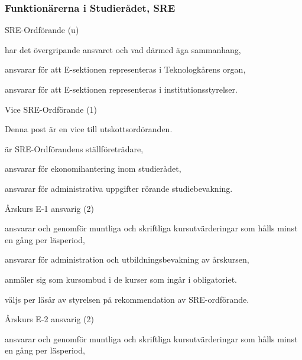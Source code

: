\documentclass[10pt]{article}
\begin{document}
\subsubsection{Funktionärerna i Studierådet, SRE}

\begin{emptylist}
    \item SRE-Ordförande (u)
        \begin{dashlist}
            \item har det övergripande ansvaret och vad därmed äga
                sammanhang,
            \item ansvarar för att E-sektionen representeras i
                Teknologkårens organ,
            \item ansvarar för att E-sektionen representeras i
                institutionsstyrelser.
        \end{dashlist}
    \item Vice SRE-Ordförande (1)
        \begin{dashlist}
            \item Denna post är en vice till utskottsordöranden.
            \item är SRE-Ordförandens ställföreträdare,
            \item ansvarar för ekonomihantering inom studierådet,
            \item ansvarar för administrativa uppgifter rörande
                studiebevakning.
        \end{dashlist}
    \item Årskurs E-1 ansvarig (2)
        \begin{dashlist}
            \item ansvarar och genomför muntliga och skriftliga
                kursutvärderingar som hålls minst en gång per läsperiod,
            \item ansvarar för administration och utbildningsbevakning av
                årskursen,
            \item anmäler sig som kursombud i de kurser som ingår i
                obligatoriet.
            \item väljs per läsår av styrelsen på rekommendation av SRE-ordförande.
        \end{dashlist}
    \item Årskurs E-2 ansvarig (2)
        \begin{dashlist}
            \item ansvarar och genomför muntliga och skriftliga
                kursutvärderingar som hålls minst en gång per läsperiod,

\end{dashlist}
\end{emptylist}
\end{document}
